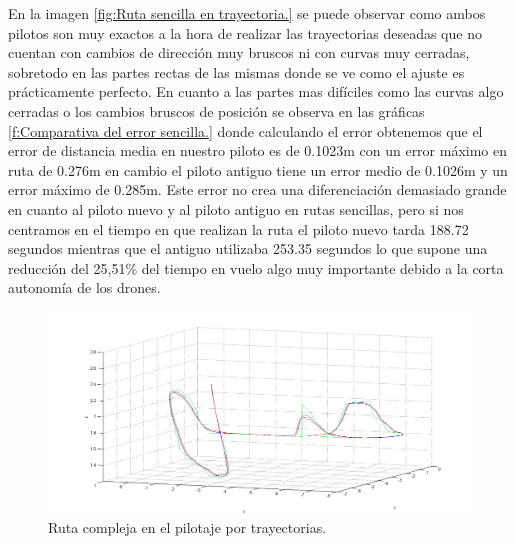 \hspace{1cm} En la imagen \ref{fig:Ruta sencilla en trayectoria.} se puede observar como ambos pilotos son muy exactos a la hora de realizar las trayectorias deseadas que no cuentan con cambios de dirección muy bruscos ni con curvas muy cerradas, sobretodo en las partes rectas de las mismas donde se ve como el ajuste es prácticamente perfecto. En cuanto a las partes mas difíciles como las curvas algo cerradas o los cambios bruscos de posición se observa en las gráficas \ref{f:Comparativa del error sencilla.} donde calculando el error obtenemos que el error de distancia media en nuestro piloto es de 0.1023m con un error máximo en ruta de 0.276m en cambio el piloto antiguo tiene un error medio de 0.1026m y un error máximo de 0.285m. Este error no crea una diferenciación demasiado grande en cuanto al piloto nuevo y al piloto antiguo en rutas sencillas, pero si nos centramos en el tiempo en que realizan la ruta el piloto nuevo tarda 188.72 segundos mientras que el antiguo utilizaba 253.35 segundos lo que supone una reducción del 25,51\% del tiempo en vuelo algo muy importante debido a la corta autonomía de los drones.

\begin{figure}[H]
	\begin{center}
		\includegraphics[width=1\textwidth]{imag/IMG41.png}
				\caption{Ruta compleja en el pilotaje por trayectorias.}
		\label{fig:Ruta compleja en trayectoria.}	
	\end{center}
\end{figure}

